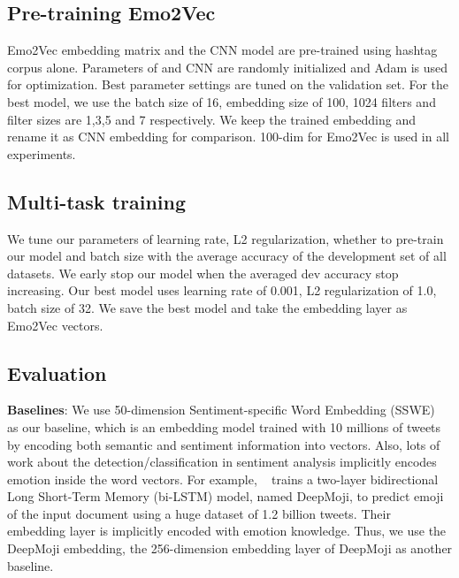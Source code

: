 \documentclass[11pt,a4paper]{article}
\begin{document}
\subsection{Pre-training Emo2Vec}
Emo2Vec embedding  matrix and the CNN model are pre-trained using hashtag corpus alone. Parameters of  and CNN are randomly initialized and Adam is used for optimization. Best parameter settings are tuned on the validation set. For the best model, we use the batch size of 16, embedding size of 100, 1024 filters and filter sizes are 1,3,5 and 7 respectively. We keep the trained embedding and rename it as CNN embedding for comparison. 100-dim for Emo2Vec is used in all experiments.

\subsection{Multi-task training}
We tune our parameters of learning rate, L2 regularization, whether to pre-train our model and batch size with the average accuracy of the development set of all datasets. We early stop our model when the averaged dev accuracy stop increasing. Our best model uses learning rate of 0.001, L2 regularization of 1.0, batch size of 32. We save the best model and take the embedding layer as Emo2Vec vectors.  

\subsection{Evaluation}

\noindent\textbf{Baselines}: We use 50-dimension Sentiment-specific Word Embedding (SSWE) ~\cite{Tang2016} as our baseline, which is an embedding model  trained with 10 millions of tweets by encoding both semantic and sentiment information into vectors. Also, lots of work about the detection/classification in sentiment analysis implicitly encodes emotion inside the word vectors. For example, ~ trains a two-layer bidirectional Long Short-Term Memory (bi-LSTM) model, named DeepMoji, to predict emoji of the input document using a huge dataset of 1.2 billion tweets. Their embedding layer is implicitly encoded with emotion knowledge. Thus, we use the DeepMoji embedding, the 256-dimension embedding layer of DeepMoji as another baseline. 
\end{document}
